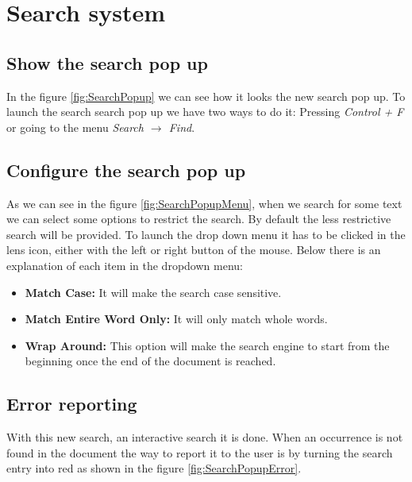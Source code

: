 
\chapter{Search system}

\section{Show the search pop up}

In the figure \ref{fig:SearchPopup} we can see how it looks the new search pop up. To launch the search search pop up we have two ways to do it: Pressing \emph{Control + F} or going to the menu \emph{Search $\to$ Find}.


\section{Configure the search pop up}

As we can see in the figure \ref{fig:SearchPopupMenu}, when we search for some text we can select some options to restrict the search. By default the less restrictive search will be provided. To launch the drop down menu it has to be clicked in the lens icon, either with the left or right button of the mouse. Below there is an explanation of each item in the dropdown menu:
\begin{itemize}
  \item \textbf{Match Case:} It will make the search case sensitive.
  \item \textbf{Match Entire Word Only:} It will only match whole words.
  \item \textbf{Wrap Around:} This option will make the search engine to start from the beginning once the end of the document is reached.
\end{itemize}


\section{Error reporting}

With this new search, an interactive search it is done. When an occurrence is not found in the document the way to report it to the user is by turning the search entry into red as shown in the figure \ref{fig:SearchPopupError}.

